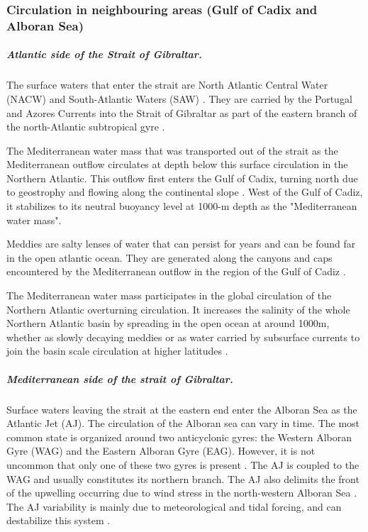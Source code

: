 \subsubsection{Circulation in neighbouring areas (Gulf of Cadix and Alboran Sea)}

\subparagraph{Atlantic side of the Strait of Gibraltar.}

The surface waters that enter the strait are North Atlantic Central Water (NACW) and South-Atlantic Waters (SAW) \citep{Millot2014,Naranjo2015}. They are carried by the Portugal and Azores Currents into the Strait of Gibraltar as part of the eastern branch of the north-Atlantic subtropical gyre \citep{barton_2001}.

The Mediterranean water mass that was transported out of the strait as the Mediterranean outflow circulates at depth below this surface circulation in the Northern Atlantic. This outflow first enters the Gulf of Cadix, turning north due to geostrophy and flowing along the continental slope \citep{price_1993,gasser_2017}. West of the Gulf of Cadiz, it stabilizes to its neutral buoyancy level at 1000-m depth as the "Mediterranean water mass"\citep{price_1993}.

Meddies are salty lenses of water that can persist for years and can be found far in the open atlantic ocean. They are generated along the canyons and caps encountered by the Mediterranean outflow in the region of the Gulf of Cadiz \citep{bashmachnikov_2015}. 

The Mediterranean water mass participates in the global circulation of the Northern Atlantic overturning circulation. It increases the salinity of the whole Northern Atlantic basin by spreading in the open ocean at around 1000m, whether as slowly decaying meddies or as water carried by subsurface currents to join the basin scale circulation at higher latitudes \citep{price_1993,jia_2007}.

\subparagraph{Mediterranean side of the strait of Gibraltar.} 

Surface waters leaving the strait at the eastern end enter the Alboran Sea as the Atlantic Jet (AJ). The circulation of the Alboran sea can vary in time. The most common state is organized around two anticyclonic gyres: the Western Alboran Gyre (WAG) and the Eastern Alboran Gyre (EAG). However, it is not uncommon that only one of these two gyres is present \citep{millot_2005}. The AJ is coupled to the WAG and usually constitutes its northern branch. The AJ also delimits the front of the upwelling occurring due to wind stress in the north-western Alboran Sea \citep{sarhan_2000}. The AJ variability is mainly due to meteorological and tidal forcing, and can destabilize this system \citep{sanchez-garrido_2013,lorente_2019}.

